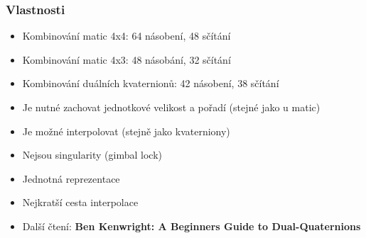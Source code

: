 \begin{frame}
\frametitle{Vlastnosti}
	\begin{itemize}
  \item Kombinování matic 4x4: 64 násobení, 48 sčítání
  \item Kombinování matic 4x3: 48 násobání, 32 sčítání
  \item Kombinování duálních kvaternionů: 42 násobení, 38 sčítání
  \item Je nutné zachovat jednotkové velikost a pořadí (stejné jako u matic)
  \item Je možné interpolovat (stejně jako kvaterniony)
  \item Nejsou singularity (gimbal lock)
  \item Jednotná reprezentace
  \item Nejkratší cesta interpolace
  \item Další čtení: \textbf{Ben Kenwright: A Beginners Guide to Dual-Quaternions}
	\end{itemize}
\end{frame}
